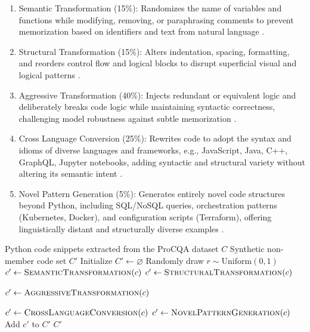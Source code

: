 \documentclass[runningheads]{llncs}
\begin{document}
\begin{enumerate}
    
\item Semantic Transformation (15\%): Randomizes the name of variables and functions while modifying, removing, or paraphrasing comments to prevent memorization based on identifiers and text from natural language \cite{r48}.

\item Structural Transformation (15\%): Alters indentation, spacing, formatting, and reorders control flow and logical blocks to disrupt superficial visual and logical patterns \cite{r50}.

\item Aggressive Transformation (40\%): Injects redundant or equivalent logic and deliberately breaks code logic while maintaining syntactic correctness, challenging model robustness against subtle memorization \cite{r52}.

\item Cross Language Conversion (25\%): Rewrites code to adopt the syntax and idioms of diverse languages and frameworks, e.g., JavaScript, Java, C++, GraphQL, Jupyter notebooks, adding syntactic and structural variety without altering its semantic intent \cite{r54}.

\item Novel Pattern Generation (5\%): Generates entirely novel code structures beyond Python, including SQL/NoSQL queries, orchestration patterns (Kubernetes, Docker), and configuration scripts (Terraform), offering linguistically distant and structurally diverse examples \cite{r56}.

\end{enumerate}

\begin{algorithm}[H]
\caption{Synthetic Non-Member Code Generation for Code Data}
\label{alg:synthetic-code-generation}

\begin{algorithmic}[1]

  \Require Python code snippets extracted from the ProCQA dataset \( C \)
  \Ensure Synthetic non-member code set \( C' \)
  \State Initialize \( C' \gets \varnothing \)
      \State Randomly draw \( r \sim \text{Uniform}(0, 1) \)
          \State \( c' \gets \textsc{SemanticTransformation}(c) \) 
          \State \( c' \gets \textsc{StructuralTransformation}(c) \)
        
          \State \( c' \gets \textsc{AggressiveTransformation}(c) \)
          
          \State \( c' \gets \textsc{CrossLanguageConversion}(c) \)
      \Else
          \State \( c' \gets \textsc{NovelPatternGeneration}(c) \)
      \EndIf
      \State Add \( c' \) to \( C' \)
  \EndFor
  \State \Return \( C' \)
\end{algorithmic}
\end{algorithm}
\end{document}
